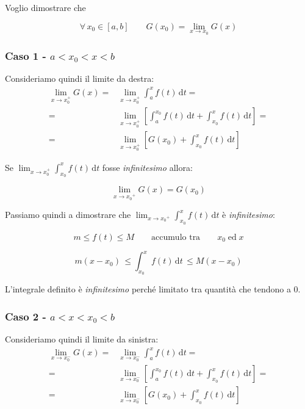 \documentclass[../dimostrazioni]{subfiles}
\begin{document}
                Voglio dimostrare che 

                \[\forall \, x_0 \in [a, b] \qquad G(x_0) = \lim_{x \to  x_0} G(x) \]
            
                \subsubsection*{Caso 1 - \(a < x_0 < x < b \)}

                    Consideriamo quindi il limite da destra:
                    \begin{align*}
                        \lim_{x \to x_0^+} G(x) =& \lim_{x \to x_0^+} \int_a^x \! f(t) \, \mathrm{d}t = \\
                        =& \lim_{x \to x_0^+} \left[ \int_a^{x_0} \! f(t) \, \mathrm{d}t + \int_{x_0}^x \! f(t) \, \mathrm{d}t \right] = \\
                        =& \lim_{x \to x_0^+} \left[ G(x_0) + \int_{x_0}^x \! f(t) \, \mathrm{d}t \right]
                    \end{align*}

                    Se \( \lim_{x \to x_0^+} \int_{x_0}^x \! f(t) \, \mathrm{d}t \) fosse \emph{infinitesimo} allora:

                    \[  \lim_{x \to {x_0}^{+}}G(x) = G(x_0) \]

                    Passiamo quindi a dimostrare che \( \lim_{x \to {x_0}^{+}} \int_{x_0}^x \! f(t) \, \mathrm{d}t \) è \emph{infinitesimo}:

                    \[m \leqslant f(t) \leqslant M \qquad \text {accumulo tra} \qquad x_0 \; \text{ed} \; x \]

                    \[m(x-x_0) \, \leqslant \int_{x_0}^x \! f(t) \, \mathrm{d}t \, \leqslant M(x-x_0) \]

                    L'integrale definito è \emph{infinitesimo} perché limitato tra quantità che tendono a 0.

                \subsubsection*{Caso 2 - \(a < x < x_0 < b \)}

                    Consideriamo quindi il limite da sinistra:
                    \begin{align*}
                        \lim_{x \to x_0^-} G(x) =& \lim_{x \to x_0^-} \int_a^x \! f(t) \, \mathrm{d}t = \\
                        =& \lim_{x \to x_0^-} \left[ \int_a^{x_0} \! f(t) \, \mathrm{d}t + \int_{x_0}^x \! f(t) \, \mathrm{d}t \right] = \\
                        =& \lim_{x \to x_0^-} \left[ G(x_0) + \int_{x_0}^x \! f(t) \, \mathrm{d}t \right]
                    \end{align*}
\end{document}
